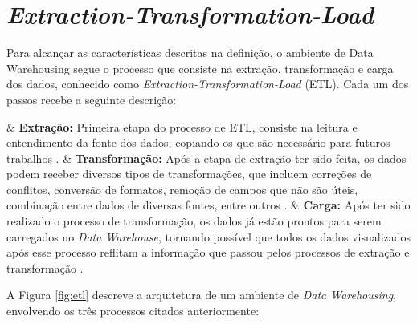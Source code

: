 \section{\textit{Extraction-Transformation-Load}}

 Para alcançar as características descritas na definição, o ambiente de Data Warehousing segue o processo que consiste na extração, transformação e carga dos dados, conhecido como \textit{Extraction-Transformation-Load} (ETL). Cada um dos passos recebe a seguinte descrição:

\begin{easylist}[itemize]

	& \textbf{Extração: } Primeira etapa do processo de ETL, consiste na leitura e entendimento da fonte 		dos dados, copiando os que são necessário para futuros trabalhos \cite{Kimball2002}.  
	& \textbf{Transformação: } Após a etapa de extração ter sido feita, os dados podem receber diversos tipos de transformações, que incluem correções de conflitos, conversão de formatos, remoção de campos que não são úteis, combinação entre dados de diversas fontes, entre outros \cite{Kimball2002}.
	& \textbf{Carga: } Após ter sido realizado o processo de transformação, os dados já estão prontos para serem carregados no \textit{Data Warehouse}, tornando possível que todos os dados visualizados após esse processo reflitam a informação que passou pelos processos de extração e transformação \cite{neeraj_sharma_2011}.  

	\end{easylist}

A Figura \ref{fig:etl} descreve a arquitetura de um ambiente de \textit{Data Warehousing}, envolvendo os três processos citados anteriormente:

